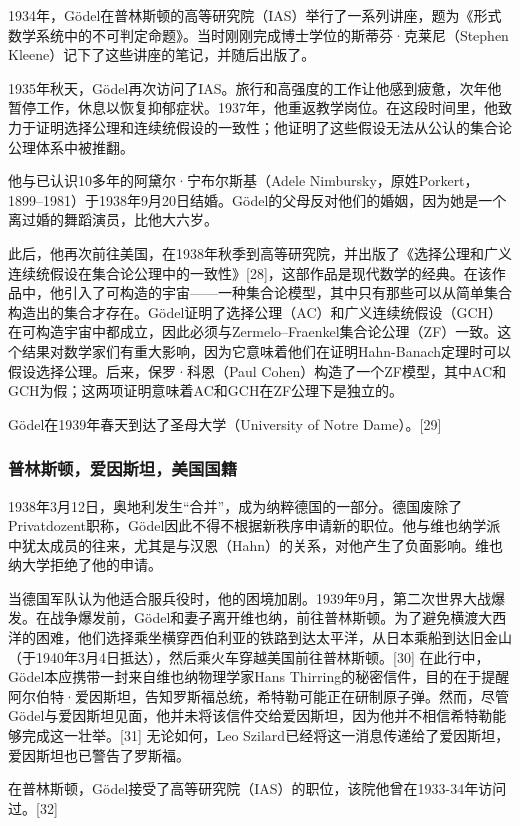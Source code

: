1934年，Gödel在普林斯顿的高等研究院（IAS）举行了一系列讲座，题为《形式数学系统中的不可判定命题》。当时刚刚完成博士学位的斯蒂芬·克莱尼（Stephen Kleene）记下了这些讲座的笔记，并随后出版了。

1935年秋天，Gödel再次访问了IAS。旅行和高强度的工作让他感到疲惫，次年他暂停工作，休息以恢复抑郁症状。1937年，他重返教学岗位。在这段时间里，他致力于证明选择公理和连续统假设的一致性；他证明了这些假设无法从公认的集合论公理体系中被推翻。

他与已认识10多年的阿黛尔·宁布尔斯基（Adele Nimbursky，原姓Porkert，1899–1981）于1938年9月20日结婚。Gödel的父母反对他们的婚姻，因为她是一个离过婚的舞蹈演员，比他大六岁。

此后，他再次前往美国，在1938年秋季到高等研究院，并出版了《选择公理和广义连续统假设在集合论公理中的一致性》[28]，这部作品是现代数学的经典。在该作品中，他引入了可构造的宇宙——一种集合论模型，其中只有那些可以从简单集合构造出的集合才存在。Gödel证明了选择公理（AC）和广义连续统假设（GCH）在可构造宇宙中都成立，因此必须与Zermelo–Fraenkel集合论公理（ZF）一致。这个结果对数学家们有重大影响，因为它意味着他们在证明Hahn-Banach定理时可以假设选择公理。后来，保罗·科恩（Paul Cohen）构造了一个ZF模型，其中AC和GCH为假；这两项证明意味着AC和GCH在ZF公理下是独立的。

Gödel在1939年春天到达了圣母大学（University of Notre Dame）。[29]
\subsubsection{普林斯顿，爱因斯坦，美国国籍} 
1938年3月12日，奥地利发生“合并”，成为纳粹德国的一部分。德国废除了Privatdozent职称，Gödel因此不得不根据新秩序申请新的职位。他与维也纳学派中犹太成员的往来，尤其是与汉恩（Hahn）的关系，对他产生了负面影响。维也纳大学拒绝了他的申请。

当德国军队认为他适合服兵役时，他的困境加剧。1939年9月，第二次世界大战爆发。在战争爆发前，Gödel和妻子离开维也纳，前往普林斯顿。为了避免横渡大西洋的困难，他们选择乘坐横穿西伯利亚的铁路到达太平洋，从日本乘船到达旧金山（于1940年3月4日抵达），然后乘火车穿越美国前往普林斯顿。[30] 在此行中，Gödel本应携带一封来自维也纳物理学家Hans Thirring的秘密信件，目的在于提醒阿尔伯特·爱因斯坦，告知罗斯福总统，希特勒可能正在研制原子弹。然而，尽管Gödel与爱因斯坦见面，他并未将该信件交给爱因斯坦，因为他并不相信希特勒能够完成这一壮举。[31] 无论如何，Leo Szilard已经将这一消息传递给了爱因斯坦，爱因斯坦也已警告了罗斯福。

在普林斯顿，Gödel接受了高等研究院（IAS）的职位，该院他曾在1933-34年访问过。[32]

